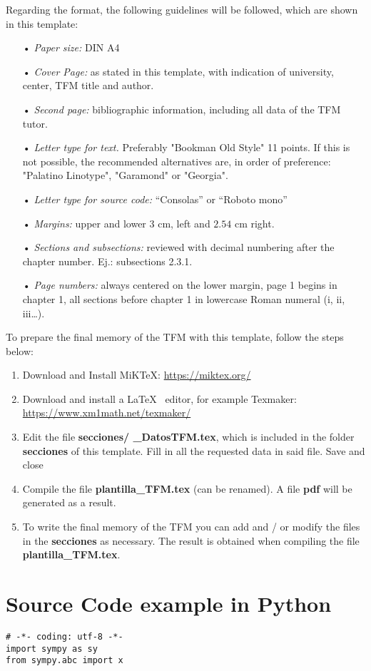 Regarding the format, the following guidelines will be followed, which are shown in this template:
\begin{itemize}
\item[•] \textit{Paper size:} DIN A4
\item[•] \textit{Cover Page:} as stated in this template, with indication of university, center, TFM title and author.
\item[•] \textit{Second page:} bibliographic information, including all data of the TFM tutor.
\item[•] \textit{Letter type for text.} Preferably "Bookman Old Style" 11 points. If this is not possible, the recommended alternatives are, in order of preference: "Palatino Linotype", "Garamond" or "Georgia".
\item[•] \textit{Letter type for source code:} “Consolas” or “Roboto mono”
\item[•] \textit{Margins:} upper and lower $3$ cm, left and $2.54$ cm right.
\item[•] \textit{Sections and subsections:} reviewed with decimal numbering after the chapter number. Ej.: subsections 2.3.1.
\item[•] \textit{Page numbers:} always centered on the lower margin, page 1 begins in chapter 1, all sections before chapter 1 in lowercase Roman numeral (i, ii, iii…).
\end{itemize}

\vspace*{1.5cm}
To prepare the final memory of the TFM with this template, follow the steps below:
\begin{enumerate}
\item Download and Install MiKTeX:  \url{https://miktex.org/}
\item Download and install a \LaTeX~ editor, for example Texmaker:\\
\url{https://www.xm1math.net/texmaker/}

\item Edit the file \textbf{secciones/ \_DatosTFM.tex}, which is included in the folder \textbf{secciones} of this template. Fill in all the requested data in said file. Save and close
\item Compile the file
 \textbf{plantilla\_TFM.tex} (can be renamed). A file \textbf{pdf} will be generated as a result.
\item To write the final memory of the TFM you can add and / or modify the files in the \textbf{secciones} as necessary. The result is obtained when compiling the file \textbf{plantilla\_TFM.tex}. 
\end{enumerate}



\section{Source Code example in Python}
\begin{lstlisting}[style=Python]
# -*- coding: utf-8 -*-
import sympy as sy
from sympy.abc import x
\end{lstlisting}
